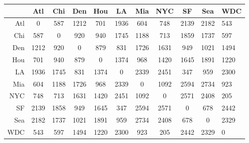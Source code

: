 \documentclass{standalone}
\begin{document}
	\begin{tabular}{r|cccccccccl}
		\toprule
		& Atl & Chi & Den & Hou & LA & Mia & NYC & SF & Sea & WDC \\
		\midrule
		Atl & 0 & 587 & 1212 & 701 & 1936 & 604 & 748 & 2139 & 2182 & 543 \\
		Chi & 587 & 0 & 920 & 940 & 1745 & 1188 & 713 & 1859 & 1737 & 597 \\
		Den & 1212 & 920 & 0 & 879 & 831 & 1726 & 1631 & 949 & 1021 & 1494 \\
		Hou & 701 & 940 & 879 & 0 & 1374 & 968 & 1420 & 1645 & 1891 & 1220 \\
		LA & 1936 & 1745 & 831 & 1374 & 0 & 2339 & 2451 & 347 & 959 & 2300 \\
		Mia & 604 & 1188 & 1726 & 968 & 2339 & 0 & 1092 & 2594 & 2734 & 923 \\
		NYC & 748 & 713 & 1631 & 1420 & 2451 & 1092 & 0 & 2571 & 2408 & 205 \\
		SF & 2139 & 1858 & 949 & 1645 & 347 & 2594 & 2571 & 0 & 678 & 2442 \\
		Sea & 2182 & 1737 & 1021 & 1891 & 959 & 2734 & 2408 & 678 & 0 & 2329 \\
		WDC & 543 & 597 & 1494 & 1220 & 2300 & 923 & 205 & 2442 & 2329 & 0 \\
		\bottomrule
	\end{tabular}
\end{document}
